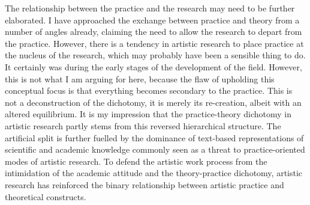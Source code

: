 \documentclass[12pt]{article}
\begin{document}
The relationship between the practice and the research may need to be further elaborated. I have approached the exchange between practice and theory from a number of angles already, claiming the need to allow the research to depart from the practice. However, there is a tendency in artistic research to place practice at the nucleus of the research, which may probably have been a sensible thing to do. It certainly was during the early stages of the development of the field. However, this is not what I am arguing for here, because the flaw of upholding this conceptual focus is that everything becomes secondary to the practice. This is not a deconstruction of the dichotomy, it is merely its re-creation, albeit with an altered equilibrium. It is my impression that the practice-theory dichotomy in artistic research partly stems from this reversed hierarchical structure. The artificial split is further fuelled by the dominance of text-based representations of scientific and academic knowledge commonly seen as a threat to practice-oriented modes of artistic research. To defend the artistic work process from the intimidation of the academic attitude and the theory-practice dichotomy, artistic research has reinforced the binary relationship between artistic practice and theoretical constructs.

\end{document}
